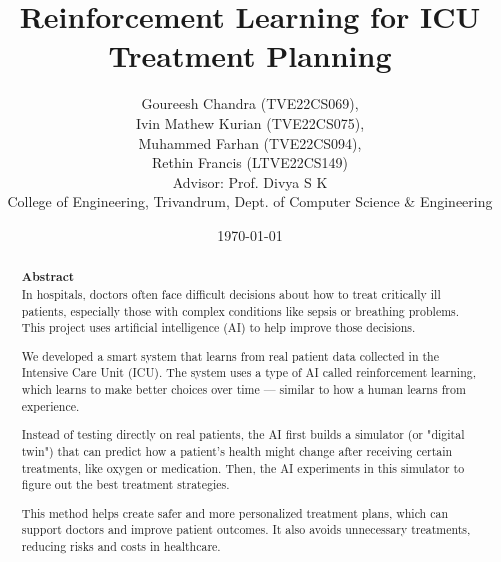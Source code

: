 \documentclass[14pt]{article}
\title{\fontsize{20pt}{24pt}\selectfont \textbf{Reinforcement Learning for ICU Treatment Planning}}
\author{%
Goureesh Chandra (TVE22CS069),\\ 
Ivin Mathew Kurian (TVE22CS075), \\
Muhammed Farhan (TVE22CS094), \\
Rethin Francis (LTVE22CS149) \\
\vspace{1cm}
Advisor: Prof. Divya S K \\
College of Engineering, Trivandrum, Dept. of Computer Science \& Engineering
}
\date{\today}
\begin{document}
\onehalfspacing
\maketitle
\vspace{1cm}

\renewcommand{\abstractname}{}
\begin{abstract}
\centering
\fontsize{16pt}{20pt}\selectfont \textbf{Abstract} \\
\vspace{0.5cm}
\justify
\fontsize{12pt}{15pt}\selectfont
In hospitals, doctors often face difficult decisions about how to treat critically ill patients, especially those with complex conditions like sepsis or breathing problems. This project uses artificial intelligence (AI) to help improve those decisions.

We developed a smart system that learns from real patient data collected in the Intensive Care Unit (ICU). The system uses a type of AI called reinforcement learning, which learns to make better choices over time — similar to how a human learns from experience.

Instead of testing directly on real patients, the AI first builds a simulator (or "digital twin") that can predict how a patient's health might change after receiving certain treatments, like oxygen or medication. Then, the AI experiments in this simulator to figure out the best treatment strategies.

This method helps create safer and more personalized treatment plans, which can support doctors and improve patient outcomes. It also avoids unnecessary treatments, reducing risks and costs in healthcare.
\end{abstract}
\end{document}
